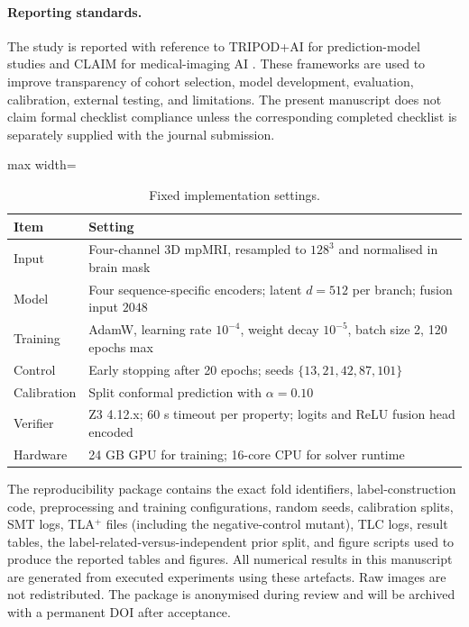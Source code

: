 \documentclass[preprint,11pt]{elsarticle}
\begin{document}
\paragraph{Reporting standards.}
The study is reported with reference to TRIPOD+AI for prediction-model studies and CLAIM for medical-imaging AI \cite{collins2024tripod,tejani2024claim}. These frameworks are used to improve transparency of cohort selection, model development, evaluation, calibration, external testing, and limitations. The present manuscript does not claim formal checklist compliance unless the corresponding completed checklist is separately supplied with the journal submission.

\begin{table}[H]
\centering
\caption{Fixed implementation settings.}
\label{tab:implementation}
\scriptsize
\begin{adjustbox}{max width=\textwidth}
\begin{tabular}{p{3.4cm}p{10.8cm}}
\toprule
\textbf{Item} & \textbf{Setting} \\
\midrule
Input & Four-channel 3D mpMRI, resampled to $128^3$ and normalised in brain mask \\
Model & Four sequence-specific encoders; latent $d=512$ per branch; fusion input $2048$ \\
Training & AdamW, learning rate $10^{-4}$, weight decay $10^{-5}$, batch size 2, 120 epochs max \\
Control & Early stopping after 20 epochs; seeds $\{13,21,42,87,101\}$ \\
Calibration & Split conformal prediction with $\alpha=0.10$ \\
Verifier & Z3 4.12.x; 60 s timeout per property; logits and ReLU fusion head encoded \\
Hardware & 24 GB GPU for training; 16-core CPU for solver runtime \\
\bottomrule
\end{tabular}
\end{adjustbox}
\end{table}

The reproducibility package contains the exact fold identifiers, label-construction code, preprocessing and training configurations, random seeds, calibration splits, SMT logs, TLA$^{+}$ files (including the negative-control mutant), TLC logs, result tables, the label-related-versus-independent prior split, and figure scripts used to produce the reported tables and figures. All numerical results in this manuscript are generated from executed experiments using these artefacts. Raw images are not redistributed. The package is anonymised during review and will be archived with a permanent DOI after acceptance.
\end{document}
